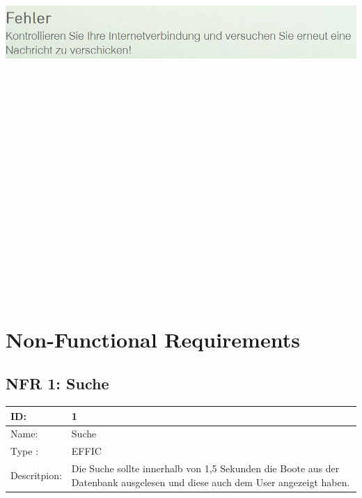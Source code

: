 \documentclass[12pt]{article}
\theoremstyle{definition}
\begin{document}
\begin{center}\includegraphics[width=15cm,height=20cm,keepaspectratio]{Fehler2.PNG}\end{center}
\pagebreak

\section{Non-Functional Requirements}

\subsection{NFR 1: Suche}
\begin{tabular}{|p{.2\linewidth}|p{.65\linewidth}|}
\hline 
ID: & 1 \\ \hline
Name: & Suche \\ \hline
Type	: & EFFIC \\ \hline
Descritpion: &  Die Suche sollte innerhalb von 1,5 Sekunden die Boote aus der Datenbank ausgelesen und diese auch dem User angezeigt haben.\\ \hline
\end{tabular}
\end{document}
